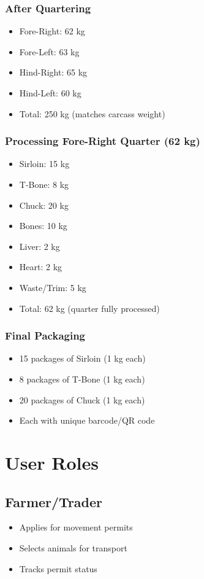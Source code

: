 \documentclass[11pt,a4paper]{article}
\begin{document}
\subsubsection{After Quartering}
\begin{itemize}[leftmargin=*]
    \item Fore-Right: 62 kg
    \item Fore-Left: 63 kg
    \item Hind-Right: 65 kg
    \item Hind-Left: 60 kg
    \item Total: 250 kg (matches carcass weight)
\end{itemize}

\subsubsection{Processing Fore-Right Quarter (62 kg)}
\begin{itemize}[leftmargin=*]
    \item Sirloin: 15 kg
    \item T-Bone: 8 kg
    \item Chuck: 20 kg
    \item Bones: 10 kg
    \item Liver: 2 kg
    \item Heart: 2 kg
    \item Waste/Trim: 5 kg
    \item Total: 62 kg (quarter fully processed)
\end{itemize}

\subsubsection{Final Packaging}
\begin{itemize}[leftmargin=*]
    \item 15 packages of Sirloin (1 kg each)
    \item 8 packages of T-Bone (1 kg each)
    \item 20 packages of Chuck (1 kg each)
    \item Each with unique barcode/QR code
\end{itemize}

\section{User Roles}

\subsection{Farmer/Trader}
\begin{itemize}[leftmargin=*]
    \item Applies for movement permits
    \item Selects animals for transport
    \item Tracks permit status
\end{itemize}
\end{document}
